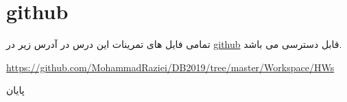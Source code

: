 \documentclass[12pt]{article}
\begin{document}
\section{github}\label{chpt2}
تمامی فایل های تمرینات این درس در آدرس زیر در 
\href{https://github.com/mohammadraziei/DB2019/}{github}
قابل دسترسی می باشد.

\begin{latin}
\begin{center}
\href{https://github.com/MohammadRaziei/DB2019/tree/master/Workspace/HWs}{https://github.com/MohammadRaziei/DB2019/tree/master/Workspace/HWs}
\end{center}
\end{latin}



\begin{center}
\vspace{1.5cm}
\huge
پایان
\end{center}
\end{document}
